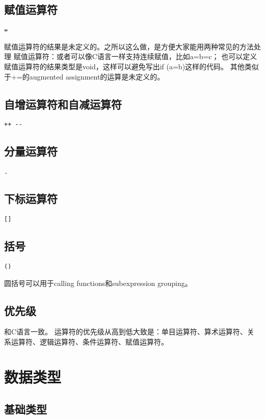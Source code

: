\documentclass[twocolumn]{article}
\begin{document}
\subsection{赋值运算符}
\begin{verbatim}
=
\end{verbatim}
赋值运算符的结果是未定义的。之所以这么做，是方便大家能用两种常见的方法处理
赋值运算符：或者可以像C语言一样支持连续赋值，比如a=b=c；
也可以定义赋值运算符的结果类型是void，这样可以避免写出if (a=b)这样的代码。
其他类似于+=的augmented assignment的运算是未定义的。

\subsection{自增运算符和自减运算符}
\begin{verbatim}
++ --
\end{verbatim}
\subsection{分量运算符}
\begin{verbatim}
.
\end{verbatim}
\subsection{下标运算符}
\begin{verbatim}
[]
\end{verbatim}
\subsection{括号}
\begin{verbatim}
()
\end{verbatim}
圆括号可以用于calling functions和subexpression grouping。
\subsection{优先级}
和C语言一致。
运算符的优先级从高到低大致是：单目运算符、算术运算符、关系运算符、逻辑运算符、条件运算符、赋值运算符。

\section{数据类型}

\subsection{基础类型}
\end{document}
